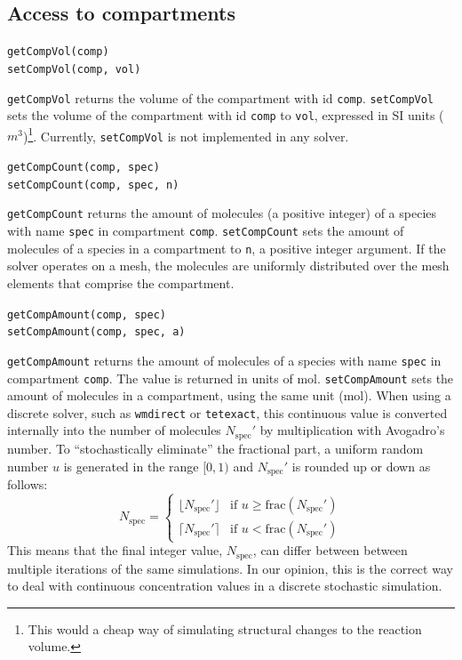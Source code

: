 \documentclass[a4paper,12pt]{book}
\begin{document}
\subsection{Access to compartments}
{\setlength{\parskip}{12pt} \setlength{\parindent}{0pt}

\texttt{getCompVol(comp)}\\
\texttt{setCompVol(comp, vol)}

\texttt{getCompVol} returns the volume of the compartment with id \texttt{comp}. \texttt{setCompVol} sets the volume of the compartment with id \texttt{comp} to \texttt{vol}, expressed in SI units ($m^3$)\footnote{This would a cheap way of simulating structural changes to the reaction volume.}. Currently, \texttt{setCompVol} is not implemented in any solver.

\texttt{getCompCount(comp, spec)}\\
\texttt{setCompCount(comp, spec, n)}

\texttt{getCompCount} returns the amount of molecules (a positive integer) of a species with name \texttt{spec} in compartment \texttt{comp}.
\texttt{setCompCount} sets the amount of molecules of a species in a compartment to \texttt{n}, a positive integer argument. If the solver operates on a mesh, the molecules are uniformly distributed over the mesh elements that comprise the compartment.

\texttt{getCompAmount(comp, spec)}\\
\texttt{setCompAmount(comp, spec, a)}

\texttt{getCompAmount} returns the amount of molecules of a species with name \texttt{spec} in compartment \texttt{comp}. The value is returned in units of mol. \texttt{setCompAmount} sets the amount of molecules in a compartment, using the same unit (mol). When using a discrete solver, such as \texttt{wmdirect} or \texttt{tetexact}, this continuous value is converted internally into the number of molecules $N_{\mathrm{spec}}'$ by multiplication with Avogadro's number. To ``stochastically eliminate'' the fractional part, a uniform random number $u$ is generated in the range $[0,1)$ and $N_{\mathrm{spec}}'$ is rounded up or down as follows:
\begin{equation}
\label{eqn:stochfracrounding}
N_{\mathrm{spec}} = 
\begin{cases}
\lfloor N_{\mathrm{spec}}' \rfloor & \text{if } u \geq \text{frac}(N_{\mathrm{spec}}') \\
\lceil N_{\mathrm{spec}}' \rceil & \text{if } u < \text{frac}(N_{\mathrm{spec}}')
\end{cases}
\end{equation}
This means that the final integer value, $N_{\mathrm{spec}}$, can differ between between multiple iterations of the same simulations. In our opinion, this is the correct way to deal with continuous concentration values in a discrete stochastic simulation.

}
\end{document}
